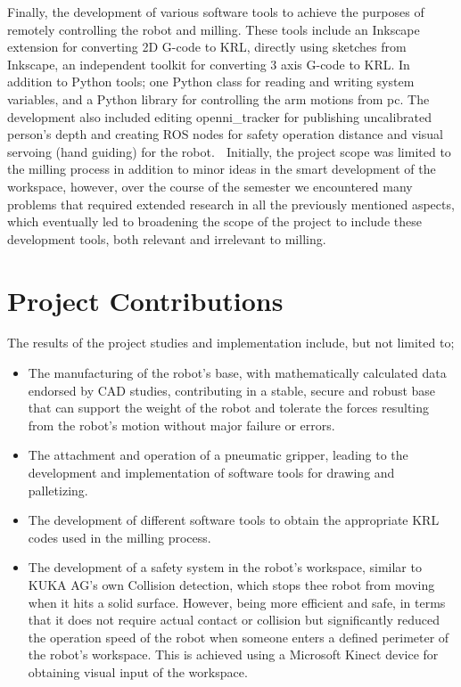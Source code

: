 Finally, the development of various software tools to achieve the purposes of remotely controlling the robot and milling. These tools include an Inkscape extension for converting 2D G-code to KRL, directly using sketches from Inkscape, an independent toolkit for converting 3 axis G-code to KRL. In addition to Python tools; one Python class for reading and writing system variables, and a Python library for controlling the arm motions from pc. The development also included editing openni\_tracker for publishing uncalibrated person's depth and creating ROS nodes for safety operation distance and visual servoing (hand guiding) for the robot.

Initially, the project scope was limited to the milling process in addition to minor ideas in the smart development of the workspace, however, over the course of the semester we encountered many problems that required extended research in all the previously mentioned aspects, which eventually led to broadening the scope of the project to include these development tools, both relevant and irrelevant to milling. 

\section{Project Contributions}
The results of the project studies and implementation include, but not limited to; 
\begin{itemize}
\item	The manufacturing of the robot’s base, with mathematically calculated data endorsed by CAD studies, contributing in a stable, secure and robust base that can support the weight of the robot and tolerate the forces resulting from the robot’s motion without major failure or errors.

\item	The attachment and operation of a pneumatic gripper, leading to the development and implementation of software tools for drawing and palletizing.

\item	The development of different software tools to obtain the appropriate KRL codes used in the milling process.

\item	The development of a safety system in the robot’s workspace, similar to KUKA AG’s own Collision detection, which stops thee robot from moving when it hits a solid surface. However, being more efficient and safe, in terms that it does not require actual contact or collision but significantly reduced the operation speed of the robot when someone enters a defined perimeter of the robot’s workspace. This is achieved using a Microsoft Kinect device for obtaining visual input of the workspace.
\end{itemize}

